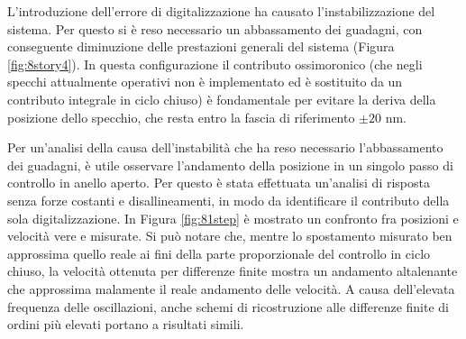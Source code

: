 L'introduzione dell'errore di digitalizzazione ha causato l'instabilizzazione del sistema. Per questo si è reso necessario un abbassamento dei guadagni, con conseguente diminuzione delle prestazioni generali del sistema (Figura \ref{fig:8story4}). In questa configurazione il contributo ossimoronico (che negli specchi attualmente operativi non è implementato ed è sostituito da un contributo integrale in ciclo chiuso) è fondamentale per evitare la deriva della posizione dello specchio, che resta entro la fascia di riferimento $\pm20$ nm.


Per un'analisi della causa dell'instabilità che ha reso necessario l'abbassamento dei guadagni, è utile osservare l'andamento della posizione in un singolo passo di controllo in anello aperto. Per questo è stata effettuata un'analisi di risposta senza forze costanti e disallineamenti, in modo da identificare il contributo della sola digitalizzazione.
In Figura \ref{fig:81step} è mostrato un confronto fra posizioni e velocità vere e misurate. Si può notare che, mentre lo spostamento misurato ben approssima quello reale ai fini della parte proporzionale del controllo in ciclo chiuso, la velocità ottenuta per differenze finite mostra un andamento altalenante che approssima malamente il reale andamento delle velocità. A causa dell'elevata frequenza delle oscillazioni, anche schemi di ricostruzione alle differenze finite di ordini più elevati portano a risultati simili. 

